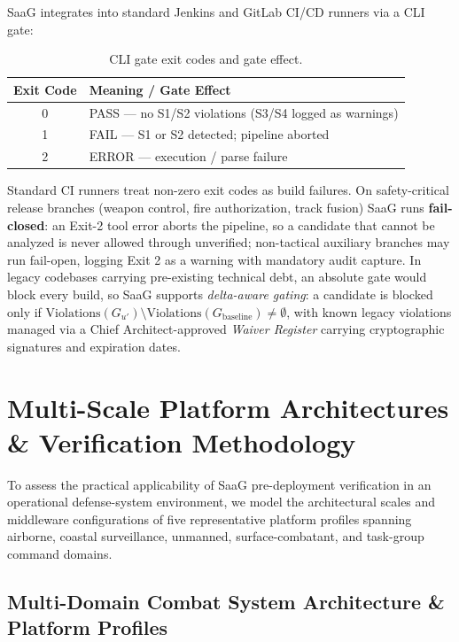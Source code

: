 \documentclass[sigconf,9pt]{acmart}
\begin{document}
SaaG integrates into standard Jenkins and GitLab CI/CD runners via a CLI gate:
\begin{table}[t]
\centering
\caption{CLI gate exit codes and gate effect.}
\label{tab:exit}
\small
\begin{tabularx}{\columnwidth}{c X}
\toprule
\textbf{Exit Code} & \textbf{Meaning / Gate Effect} \\
\midrule
0 & PASS --- no S1/S2 violations (S3/S4 logged as warnings) \\
1 & FAIL --- S1 or S2 detected; pipeline aborted \\
2 & ERROR --- execution / parse failure \\
\bottomrule
\end{tabularx}
\end{table}
Standard CI runners treat non-zero exit codes as build failures. On safety-critical release branches (weapon control, fire authorization, track fusion) SaaG runs \textbf{fail-closed}: an Exit-2 tool error aborts the pipeline, so a candidate that cannot be analyzed is never allowed through unverified; non-tactical auxiliary branches may run fail-open, logging Exit 2 as a warning with mandatory audit capture. In legacy codebases carrying pre-existing technical debt, an absolute gate would block every build, so SaaG supports \emph{delta-aware gating}: a candidate is blocked only if $\mathrm{Violations}(G_{u'}) \setminus \mathrm{Violations}(G_{\text{baseline}}) \neq \emptyset$, with known legacy violations managed via a Chief Architect-approved \emph{Waiver Register} carrying cryptographic signatures and expiration dates.

\section{Multi-Scale Platform Architectures \& Verification Methodology}\label{sec:platforms}

To assess the practical applicability of SaaG pre-deployment verification in an operational defense-system environment, we model the architectural scales and middleware configurations of five representative platform profiles spanning airborne, coastal surveillance, unmanned, surface-combatant, and task-group command domains.

\subsection{Multi-Domain Combat System Architecture \& Platform Profiles}
\end{document}
